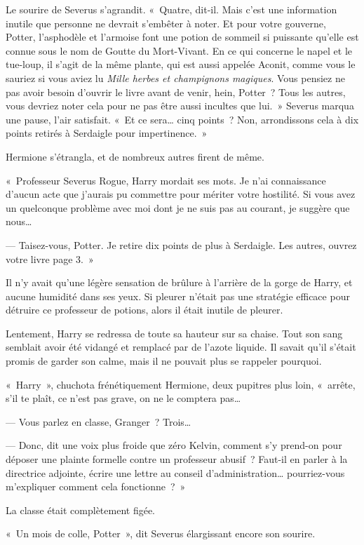 Le sourire de Severus s'agrandit.
«~Quatre, dit-il.
Mais c'est une information inutile que personne ne devrait s'embêter à noter.
Et pour votre gouverne, Potter, l'asphodèle et l'armoise font une potion de sommeil si puissante qu'elle est connue sous le nom de Goutte du Mort-Vivant.
En ce qui concerne le napel et le tue-loup, il s'agit de la même plante, qui est aussi appelée Aconit, comme vous le sauriez si vous aviez lu \emph{Mille herbes et champignons magiques}.
Vous pensiez ne pas avoir besoin d'ouvrir le livre avant de venir, hein, Potter~?
Tous les autres, vous devriez noter cela pour ne pas être aussi incultes que lui.~»
Severus marqua une pause, l'air satisfait.
«~Et ce sera… cinq points~?
Non, arrondissons cela à dix points retirés à Serdaigle pour impertinence.~»

Hermione s'étrangla, et de nombreux autres firent de même.

«~Professeur Severus Rogue, Harry mordait ses mots.
Je n'ai connaissance d'aucun acte que j'aurais pu commettre pour mériter votre hostilité.
Si vous avez un quelconque problème avec moi dont je ne suis pas au courant, je suggère que nous…

--- Taisez-vous, Potter.
Je retire dix points de plus à Serdaigle.
Les autres, ouvrez votre livre page 3.~»

Il n'y avait qu'une légère sensation de brûlure à l'arrière de la gorge de Harry, et aucune humidité dans ses yeux.
Si pleurer n'était pas une stratégie efficace pour détruire ce professeur de potions, alors il était inutile de pleurer.

Lentement, Harry se redressa de toute sa hauteur sur sa chaise.
Tout son sang semblait avoir été vidangé et remplacé par de l'azote liquide.
Il savait qu'il s'était promis de garder son calme, mais il ne pouvait plus se rappeler pourquoi.

«~Harry~», chuchota frénétiquement Hermione, deux pupitres plus loin, «~arrête, s'il te plaît, ce n'est pas grave, on ne le comptera pas…

--- Vous parlez en classe, Granger~?
Trois…

--- Donc, dit une voix plus froide que zéro Kelvin, comment s'y prend-on pour déposer une plainte formelle contre un professeur abusif~?
Faut-il en parler à la directrice adjointe, écrire une lettre au conseil d'administration… pourriez-vous m'expliquer comment cela fonctionne~?~»

La classe était complètement figée.

«~Un mois de colle, Potter~», dit Severus élargissant encore son sourire.

